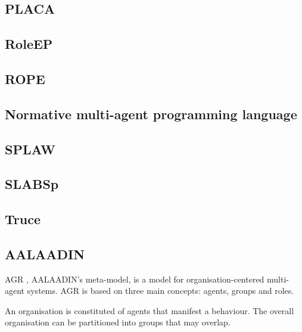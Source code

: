 \documentclass{article}
\begin{document}
\cite{conf/rex/BarringerFGGO89}

\subsection{PLACA}

\cite{}

\subsection{RoleEP}

\cite{ubayashi2002roleep}

\subsection{ROPE}

\cite{conf/coopis/BechtGKM99}

\subsection{Normative multi-agent programming language}

\cite{}

\subsection{SPLAW}

\cite{}

\subsection{SLABSp}

\cite{}

\subsection{Truce}

\cite{conf/coordination/JamisonL99}

\subsection{AALAADIN} 
\label{sec:aalaadin}

AGR \cite{conf/aose/FerberGM03}, AALAADIN's meta-model, is a model for organisation-centered
multi-agent systems. AGR is based on three main concepts: agents,
groups and roles.

An organisation is constituted of agents that manifest a behaviour.
The overall organisation can be partitioned into groups that may
overlap. 
\end{document}
